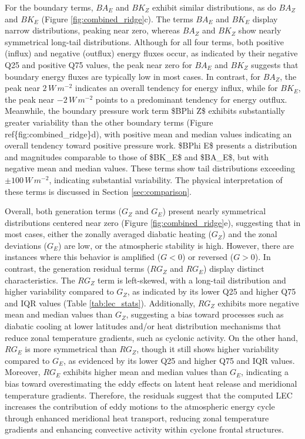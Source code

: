 \documentclass[pdflatex,sn-chicago]{sn-jnl}%
\theoremstyle{plain}
\theoremstyle{definition}
\theoremstyle{remark}
\theoremstyle{definition}
\begin{document}
For the boundary terms, $BA_E$ and $BK_Z$ exhibit similar distributions, as do $BA_Z$ and $BK_E$ (Figure \ref{fig:combined_ridge}c). The terms $BA_E$ and $BK_E$ display narrow distributions, peaking near zero, whereas $BA_Z$ and $BK_Z$ show nearly symmetrical long-tail distributions. Although for all four terms, both positive (influx) and negative (outflux) energy fluxes occur, as indicated by their negative Q25 and positive Q75 values, the peak near zero for $BA_E$ and $BK_Z$ suggests that boundary energy fluxes are typically low in most cases. In contrast, for $BA_Z$, the peak near $2 \, W \, m^{-2}$ indicates an overall tendency for energy influx, while for $BK_E$, the peak near $-2 \, W \, m^{-2}$ points to a predominant tendency for energy outflux. Meanwhile, the boundary pressure work term \$BPhi Z\$ exhibits substantially greater variability than the other boundary terms (Figure ref\{fig:combined\_ridge\}d), with positive mean and median values indicating an overall tendency toward positive pressure work.  \$BPhi E\$ presents a distribution and magnitudes comparable to those of \$BK\_E\$ and \$BA\_E\$, but with negative mean and median values. These terms show tail distributions exceeding $\pm 100 \, W \, m^{-2}$, indicating substantial variability. The physical interpretation of these terms is discussed in Section \ref{sec:comparison}.

Overall, both generation terms ($G_Z$ and $G_E$) present nearly symmetrical distributions centered near zero (Figure \ref{fig:combined_ridge}e), suggesting that in most cases, either the zonally averaged diabatic heating ($G_Z$) and the zonal deviations ($G_E$) are low, or the atmospheric stability is high. However, there are instances where this behavior is amplified ($G < 0$) or reversed ($G > 0$). In contrast, the generation residual terms ($RG_Z$ and $RG_E$) display distinct characteristics. The $RG_Z$ term is left-skewed, with a long-tail distribution and higher variability compared to $G_Z$, as indicated by its lower Q25 and higher Q75 and IQR values (Table \ref{tab:lec_stats}). Additionally, $RG_Z$ exhibits more negative mean and median values than $G_Z$, suggesting a bias toward processes such as diabatic cooling at lower latitudes and/or heat distribution mechanisms that reduce zonal temperature gradients, such as cyclonic activity. On the other hand, $RG_E$ is more symmetrical than $RG_Z$, though it still shows higher variability compared to $G_E$, as evidenced by its lower Q25 and higher Q75 and IQR values. Moreover, $RG_E$ exhibits higher mean and median values than $G_E$, indicating a bias toward overestimating the eddy effects on latent heat release and meridional temperature gradients. Therefore, the residuals suggest that the computed LEC increases the contribution of eddy motions to the atmospheric energy cycle through enhanced meridional heat transport, reducing zonal temperature gradients and enhancing convective activity within cyclone frontal structures.
\end{document}
